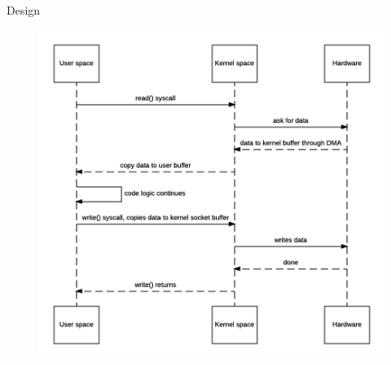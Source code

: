 \begin{frame}[plain,t]{Design} %
     \\
    \vspace{-1ex}
    \begin{figure}
        \centering
        \includegraphics[width=0.7\linewidth]{image/0201}
        \label{fig:0201}
    \end{figure}
    
    
    
\end{frame}

